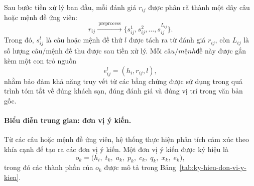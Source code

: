 Sau bước tiền xử lý ban đầu, mỗi đánh giá $r_{ij}$ được phân rã thành một
dãy câu hoặc mệnh đề ứng viên:
%
\begin{equation}
  r_{ij}
  \xrightarrow{\ \text{preprocess}\ }
  \{s_{ij}^{1}, s_{ij}^{2}, \dots, s_{ij}^{L_{ij}}\}.
  \label{eq:preprocess-review}
\end{equation}
%
Trong đó, $s_{ij}^{l}$ là câu hoặc mệnh đề thứ $l$ được tách ra từ đánh giá
$r_{ij}$, còn $L_{ij}$ là số lượng câu/mệnh đề thu được sau tiền xử lý. Mỗi
$câu/mệnh đề$ này được gắn kèm một con trỏ nguồn
%
\begin{equation}
  e_{ij}^{l} = (h_i, r_{ij}, l),
  \label{eq:source-pointer}
\end{equation}
%
nhằm bảo đảm khả năng truy vết từ các bằng chứng được sử dụng trong quá
trình tóm tắt về đúng khách sạn, đúng đánh giá và đúng vị trí trong văn bản
gốc.

\paragraph{Biểu diễn trung gian: đơn vị ý kiến.}
Từ các câu hoặc mệnh đề ứng viên, hệ thống thực hiện phân tích cảm xúc theo
khía cạnh để tạo ra các đơn vị ý kiến. Một đơn vị ý kiến được ký hiệu là
%
\begin{equation}
  o_k = \big(h_i,\; t_k,\; a_k,\; p_k,\; c_k,\; q_k,\; x_k,\; e_k\big),
  \label{eq:don-vi-y-kien}
\end{equation}
%
trong đó các thành phần của $o_k$ được mô tả trong
Bảng~\ref{tab:ky-hieu-don-vi-y-kien}.


